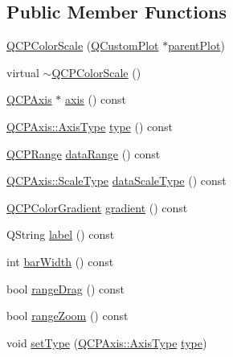 \subsection*{Public Member Functions}
\begin{DoxyCompactItemize}
\item 
\mbox{\hyperlink{class_q_c_p_color_scale_aa8debce1be38b54287c04d4f584394b4}{Q\+C\+P\+Color\+Scale}} (\mbox{\hyperlink{class_q_custom_plot}{Q\+Custom\+Plot}} $\ast$\mbox{\hyperlink{class_q_c_p_layerable_a473edb813a4c1929d6b6a8fe3ff3faf7}{parent\+Plot}})
\item 
virtual \mbox{\hyperlink{class_q_c_p_color_scale_a49d8d2d155c15fa315fdc0427194c9ea}{$\sim$\+Q\+C\+P\+Color\+Scale}} ()
\item 
\mbox{\hyperlink{class_q_c_p_axis}{Q\+C\+P\+Axis}} $\ast$ \mbox{\hyperlink{class_q_c_p_color_scale_a39bdbdb3b212602a5a57f9f3ea444190}{axis}} () const
\item 
\mbox{\hyperlink{class_q_c_p_axis_ae2bcc1728b382f10f064612b368bc18a}{Q\+C\+P\+Axis\+::\+Axis\+Type}} \mbox{\hyperlink{class_q_c_p_color_scale_a85d7e286fbfc0c04c4b480aff3cb66fb}{type}} () const
\item 
\mbox{\hyperlink{class_q_c_p_range}{Q\+C\+P\+Range}} \mbox{\hyperlink{class_q_c_p_color_scale_a51f5756f99867bd91e570eddefeb1ef4}{data\+Range}} () const
\item 
\mbox{\hyperlink{class_q_c_p_axis_a36d8e8658dbaa179bf2aeb973db2d6f0}{Q\+C\+P\+Axis\+::\+Scale\+Type}} \mbox{\hyperlink{class_q_c_p_color_scale_ad864329d93cbd7396af1b2024db7fcfe}{data\+Scale\+Type}} () const
\item 
\mbox{\hyperlink{class_q_c_p_color_gradient}{Q\+C\+P\+Color\+Gradient}} \mbox{\hyperlink{class_q_c_p_color_scale_a31d4e3b49461bf6b265eabd028d0f7b2}{gradient}} () const
\item 
Q\+String \mbox{\hyperlink{class_q_c_p_color_scale_a3dbac1121a90172d62f01ab80b1ad641}{label}} () const
\item 
int \mbox{\hyperlink{class_q_c_p_color_scale_ae02ab8e4bfaa919577992e73242f491f}{bar\+Width}} () const
\item 
bool \mbox{\hyperlink{class_q_c_p_color_scale_a2a0670492f2a780596ea455ea8496a78}{range\+Drag}} () const
\item 
bool \mbox{\hyperlink{class_q_c_p_color_scale_adb4c3ada2b1e5ebbdead3b097064ff0b}{range\+Zoom}} () const
\item 
void \mbox{\hyperlink{class_q_c_p_color_scale_a1bf9bdb291927c422dd66b404b206f1f}{set\+Type}} (\mbox{\hyperlink{class_q_c_p_axis_ae2bcc1728b382f10f064612b368bc18a}{Q\+C\+P\+Axis\+::\+Axis\+Type}} \mbox{\hyperlink{class_q_c_p_color_scale_a85d7e286fbfc0c04c4b480aff3cb66fb}{type}})

\end{DoxyCompactItemize}
